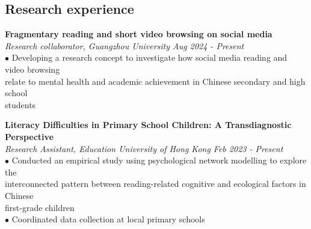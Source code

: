 \documentclass[a4paper, 10pt]{article}
\begin{document}
\subsection*{Research experience}







\textbf{Fragmentary reading and short video browsing on social media} \\
\textit{Research collaborator, Guangzhou University \hfill Aug 2024 - Present} \\
$\bullet$\hspace{1.8em} 
Developing a research concept to investigate how social media reading and video browsing \\ \indent\hspace{2.3em} relate to mental health and academic achievement in Chinese secondary and high school \\ \indent\hspace{2.3em} students \\ 

\bigskip

\textbf{Literacy Difficulties in Primary School Children: A Transdiagnostic Perspective} \\
\textit{Research Assistant, Education University of Hong Kong \hfill Feb 2023 - Present} \\
$\bullet$\hspace{1.8em} Conducted an empirical study using psychological network modelling to explore the \\ \indent\hspace{2.3em} interconnected pattern between reading-related cognitive and ecological factors in Chinese \\ \indent\hspace{2.3em} first-grade children \\
$\bullet$\hspace{1.8em} Coordinated data collection at local primary schools \\
\end{document}
